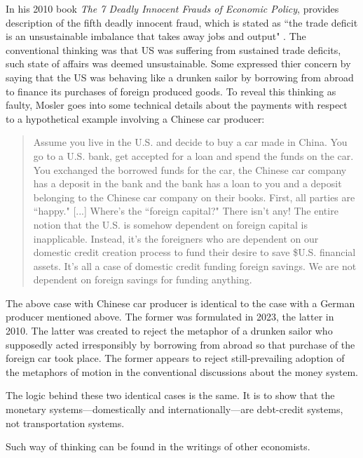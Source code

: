 In his 2010 book \textit{The 7 Deadly Innocent Frauds of Economic Policy}, \citeauthor{mosler2010} provides description of the fifth deadly innocent fraud, which is stated as ``the trade deficit is an unsustainable imbalance that takes away jobs and output" \citep[pp.~59-62]{mosler2010}.
The conventional thinking was that US was suffering from sustained trade deficits, such state of affairs was deemed unsustainable. Some expressed thier concern by saying that the US was behaving like a drunken sailor by borrowing from abroad to finance its purchases of foreign produced goods.
To reveal this thinking as faulty, Mosler goes into some technical details about the payments with respect to a hypothetical example involving a Chinese car producer:

\begin{quote}
Assume you live in the U.S. and decide to buy a car made in China. You go to a U.S. bank, get accepted for a loan and spend the funds on the car. You exchanged the borrowed funds for the car, the Chinese car company has a deposit in the bank and the bank has a loan to you and a deposit belonging to the Chinese car company on their books. First, all parties are ``happy." [...] Where's the ``foreign capital?" There isn't any! The entire notion that the U.S. is somehow dependent on foreign capital is inapplicable. Instead, it's the foreigners who are dependent on our domestic credit creation process to fund their desire to save \$U.S. financial assets. It's all a case of domestic credit funding foreign savings. We are not dependent on foreign savings for funding anything. \citep[pp.~61-62]{mosler2010}
\end{quote}

The above case with Chinese car producer is identical to the case with a German producer mentioned above.
The former was formulated in 2023, the latter in 2010.
The latter was created to reject the metaphor of a drunken sailor who supposedly acted irresponsibly by borrowing from abroad so that purchase of the foreign car took place.
The former appears to reject still-prevailing adoption of the metaphors of motion in the conventional discussions about the money system.

The logic behind these two identical cases is the same.
It is to show that the monetary systems---domestically and internationally---are debt-credit systems, not transportation systems.

Such way of thinking can be found in the writings of other economists.

